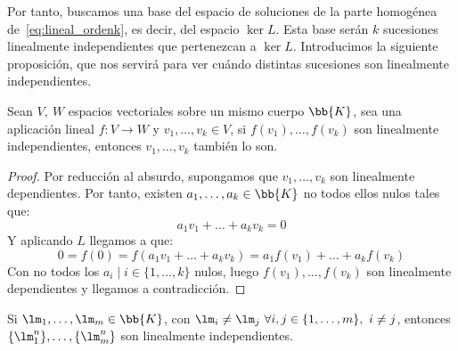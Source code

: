 Por tanto, buscamos una base del espacio de soluciones de la parte homogénea de~\ref{eq:lineal_ordenk}, es decir, del espacio $\ker L$. Esta base serán $k$ sucesiones linealmente independientes que pertenezcan a $\ker L$. Introducimos la siguiente proposición, que nos servirá para ver cuándo distintas sucesiones son linealmente independientes.
\begin{prop}
    Sean $V,~W$ espacios vectoriales sobre un mismo cuerpo $\bb{K}$, sea una aplicación lineal $f:V\rightarrow W$ y $v_1, \ldots, v_k \in V$, si $f(v_1), \ldots, f(v_k)$ son linealmente independientes, entonces $v_1, \ldots, v_k$ también lo son.
\end{prop}
\begin{proof}
    Por reducción al absurdo, supongamos que $v_1, \ldots, v_k$ son linealmente dependientes. Por tanto, existen $a_1, \ldots, a_k \in \bb{K}$ no todos ellos nulos tales que:
    \begin{equation*}
        a_1 v_1 + \ldots + a_k v_k = 0
    \end{equation*}
    Y aplicando $L$ llegamos a que:
    \begin{equation*}
        0 = f(0) = f(a_1 v_1 + \ldots + a_k v_k) = a_1f(v_1) + \ldots + a_k f(v_k) 
    \end{equation*}
    Con no todos los $a_i\mid i \in \{1, \ldots, k\}$ nulos, luego $f(v_1), \ldots, f(v_k)$ son linealmente dependientes y llegamos a contradicción.
\end{proof}
\begin{coro}\label{coro:lin_indep_raices}
    Si $\lm_1,\dots,\lm_m\in \bb{K}$, con $\lm_i \neq \lm_j~\forall i,j\in \{1,\dots,m\},~i\neq j$, entonces $\{\lm_1^n\},\dots,\{\lm_m^n\}$ son linealmente independientes.
\end{coro}
